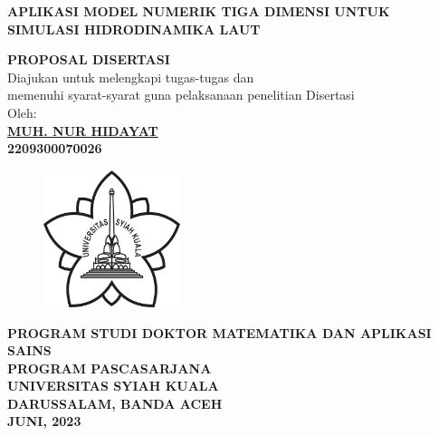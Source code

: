 \begin{spacing}{1}
	\begin{center}
		{\Large\textbf{APLIKASI MODEL NUMERIK TIGA DIMENSI UNTUK SIMULASI HIDRODINAMIKA LAUT}}\\[1.0cm]
	\end{center}
	\vspace*{0.8cm} 
	
	\begin{center}
		
		\large{\textbf{PROPOSAL DISERTASI}}
		\\\vspace*{1.8cm}    
		\normalsize{Diajukan untuk melengkapi tugas-tugas dan \\
			memenuhi syarat-syarat guna pelaksanaan penelitian Disertasi}\\[1.5cm]
		\vspace*{1cm}  
		{\large Oleh:}\\
		\vspace*{1cm}       
		\large{\textbf{\underline{MUH. NUR HIDAYAT}}}
		\\\large{\textbf{2209300070026}} 
	\end{center}\vspace*{1cm}   
	
	\begin{figure}[h]
		\centering
		\includegraphics[width=4cm]{contents/Figures/USK} %
	\end{figure}
	\vspace*{1.5cm}   
	
	\begin{center}
		\textbf{PROGRAM STUDI DOKTOR MATEMATIKA DAN APLIKASI SAINS\\
			PROGRAM PASCASARJANA \\
			UNIVERSITAS SYIAH KUALA\\
			DARUSSALAM, BANDA ACEH\\
			JUNI, 2023}
	\end{center}
	\thispagestyle{empty}
\end{spacing}
